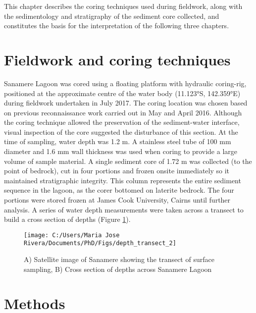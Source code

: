 \documentclass[
  12pt,
]{book}
\begin{document}
This chapter describes the coring techniques used during fieldwork, along with the sedimentology and stratigraphy of the sediment core collected, and constitutes the basis for the interpretation of the following three chapters.

\hypertarget{fieldwork-and-coring-techniques}{%
\section{Fieldwork and coring techniques}\label{fieldwork-and-coring-techniques}}

Sanamere Lagoon was cored using a floating platform with hydraulic coring-rig, positioned at the approximate centre of the water body (11.123°S, 142.359°E) during fieldwork undertaken in July 2017. The coring location was chosen based on previous reconnaissance work carried out in May and April 2016. Although the coring technique allowed the preservation of the sediment-water interface, visual inspection of the core suggested the disturbance of this section. At the time of sampling, water depth was 1.2 m. A stainless steel tube of 100 mm diameter and 1.6 mm wall thickness was used when coring to provide a large volume of sample material. A single sediment core of 1.72 m was collected (to the point of bedrock), cut in four portions and frozen onsite immediately so it maintained stratigraphic integrity. This column represents the entire sediment sequence in the lagoon, as the corer bottomed on laterite bedrock. The four portions were stored frozen at James Cook University, Cairns until further analysis. A series of water depth measurements were taken across a transect to build a cross section of depths (Figure \ref{fig:depth}).

\begin{figure}

{\centering \texttt{[image: C:/Users/Maria Jose Rivera/Documents/PhD/Figs/depth\_transect\_2]} 

}

\caption{A) Satellite image of Sanamere showing the transect of surface sampling, B) Cross section of depths across Sanamere Lagoon}\label{fig:depth}
\end{figure}



\hypertarget{methods}{%
\section{Methods}\label{methods}}
\end{document}
